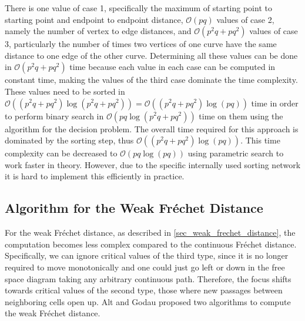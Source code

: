 \documentclass[
oneside,
fontsize=11pt
]{scrartcl}
\begin{document}
There is one value of case 1, 
specifically the maximum of starting point to starting point and endpoint to endpoint distance,
$\mathcal{O}(pq)$ values of case 2, 
namely the number of vertex to edge distances,
and $\mathcal{O}(p^2q + pq^2)$ values of case 3,
particularly the number of times two vertices of one curve have the same distance to one edge of the other curve.
Determining all these values can be done in $\mathcal{O}(p^2q + pq^2)$ time 
because each value in each case can be computed in constant time, 
making the values of the third case dominate the time complexity.
These values need to be sorted in $\mathcal{O}((p^2q + pq^2) \log (p^2q + pq^2)) = \mathcal{O}((p^2q + pq^2) \log (pq))$ time
in order to perform binary search in $\mathcal{O}(pq \log (p^2q + pq^2))$ time on them
using the algorithm for the decision problem.
The overall time required for this approach is dominated by the sorting step, 
thus $\mathcal{O}((p^2q + pq^2) \log (pq))$.
This time complexity can be decreased to $\mathcal{O}(pq \log (pq))$ 
using parametric search \cite{megiddo_applying_1983, cole_slowing_1987} to work faster in theory.
However, due to the specific internally used sorting network 
it is hard to implement this efficiently in practice. \cite{alt_computing_1995}






\subsection{Algorithm for the Weak Fréchet Distance}
\label{sec_weak_algorithm}
For the weak Fréchet distance, as described in \autoref{sec_weak_frechet_distance},
the computation becomes less complex compared to the continuous Fréchet distance.
Specifically, we can ignore critical values of the third type, 
since it is no longer required to move monotonically 
and one could just go left or down in the free space diagram taking any arbitrary continuous path.
Therefore, the focus shifts towards critical values of the second type, 
those where new passages between neighboring cells open up.
Alt and Godau \cite{alt_computing_1995} proposed two algorithms to compute the weak Fréchet distance.
\end{document}
